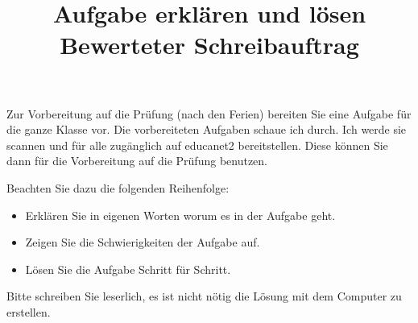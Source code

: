 \documentclass[12pt,a5paper,twoside]{article}
\title{Aufgabe erklären und lösen\\Bewerteter Schreibauftrag}
\date{}
\begin{document}
\maketitle

Zur Vorbereitung auf die Prüfung (nach den Ferien) bereiten Sie eine Aufgabe für die ganze Klasse vor.
Die vorbereiteten Aufgaben schaue ich durch. Ich werde sie scannen und für alle zugänglich auf educanet2 bereitstellen.
Diese können Sie dann für die Vorbereitung auf die Prüfung benutzen.

Beachten Sie dazu die folgenden Reihenfolge:

\begin{itemize}
	\item Erklären Sie in eigenen Worten worum es in der Aufgabe geht.
	\item Zeigen Sie die Schwierigkeiten der Aufgabe auf.
	\item Lösen Sie die Aufgabe Schritt für Schritt.
\end{itemize}


Bitte schreiben Sie leserlich, es ist nicht nötig die Lösung mit dem Computer zu erstellen.
\end{document}
